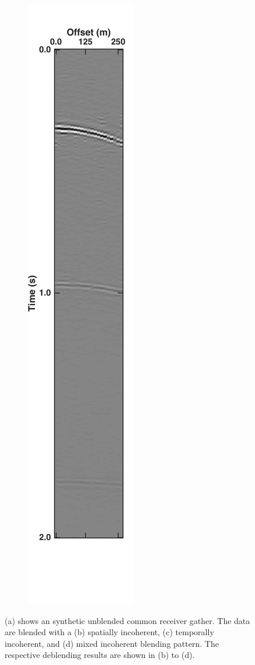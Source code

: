\begin{figure}
\begin{subfigure}[t]{0.24\textwidth}
		\caption{}
		\label{fig:Ch-Results-Debl-inline10-t}
	\end{subfigure}
	\centering
	\begin{subfigure}[t]{0.24\textwidth}
		\centering
		\includegraphics[height = 0.38\textheight]{Plots/BlendingPatterns/Deblended_xline10xt}
		\caption{}
		\label{fig:Ch-Results-Debl-inline10-xt}
	\end{subfigure}
	
	\caption{(a) shows an synthetic unblended common receiver gather. The data are blended with a (b) spatially incoherent, (c) temporally incoherent, and (d) mixed incoherent blending pattern. The respective deblending results are shown in (b) to (d).}
	\label{fig:Ch-Results-Debl-x-inline}

\end{figure}



